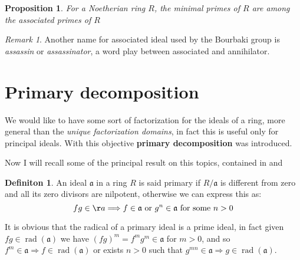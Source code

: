 \documentclass[notitlepage, a4]{book}
\theoremstyle{plain}
\newtheorem{prop}[teo]{Proposition}
\theoremstyle{remark}
\newtheorem{rem}{Remark}
\theoremstyle{definition}
\newtheorem{deff}[teo]{Definiton}
\newcommand{\A}{\mathfrak{a}}
\DeclareMathOperator{\rad}{rad}
\newcounter{que}
\begin{document}
\begin{prop} \label{prop:minprimes}
	For a Noetherian ring $ R$, the minimal primes of $ R $ are among the associated primes of $ R $
\end{prop}

%
%

\begin{rem}
	Another name for associated ideal used by the Bourbaki group is \textit{assassin} or \textit{assassinator}, a word play between associated and annihilator. %
\end{rem}

\section{Primary decomposition}

We would like to have some sort of factorization for the ideals of a ring, more general than the \textit{unique factorization domains}, in fact this is useful only for principal ideals. With this objective \textbf{primary decomposition} was introduced. 

Now I will recall some of the principal result on this topics, contained in \cite[Section 7]{Reid} and \cite[Section 4 and Page 83]{AMCD}

\begin{deff}
	An ideal $ \A $ in a ring $ R $ is said primary if $ R/\A$ is different from zero and all its zero divisors are nilpotent, otherwise we can express this as:
	\begin{equation*}
		fg \in \aa \Longrightarrow f \in \A \text{ or } g^n \in \A \text{ for some } n >0
	\end{equation*}
\end{deff}

It is obvious that the radical of a primary ideal is a prime ideal, in fact given $ fg \in \rad(\A)  $ we have $ (fg)^m = f^m g^m \in \A $ for $ m>0 $, and so $ f^m \in \A \Rightarrow f \in \rad(\A)$ or exists $ n>0 $ such that $ g^{mn} \in \A \Rightarrow g \in \rad(\A) $.
\end{document}
